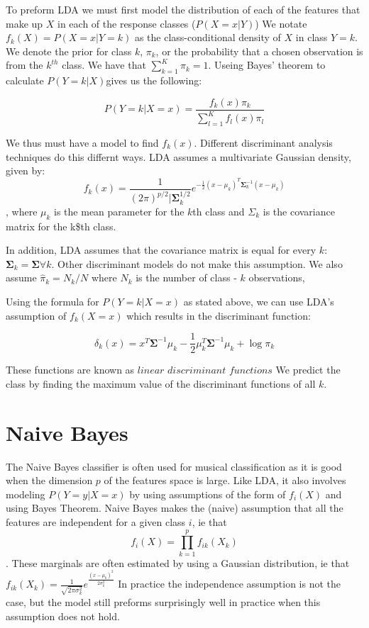 \documentclass[12pt,twoside]{reedthesis}
\theoremstyle{definition}
\theoremstyle{definition}
\theoremstyle{definition}
\theoremstyle{remark}
\begin{document}
To preform LDA we must first model the distribution of each of the
features that make up \(X\) in each of the response classes
(\(P(X = x|Y)\)) We notate \(f_k(X) = P(X = x| Y = k)\) as the
class-conditional density of \(X\) in class \(Y = k\). We denote the
prior for class \(k\), \(\pi_k\), or the probability that a chosen
observation is from the \(k^{th}\) class. We have that
\(\sum_{k=1}^K \pi_k = 1\). Useing Bayes' theorem to calculate
\(P(Y = k |X)\)gives us the following:

\[ P(Y = k | X = x) = \frac{f_k(x)\pi_k}{\sum_{l = 1}^Kf_l(x)\pi_l}\]

We thus must have a model to find \(f_k(x)\). Different discriminant
analysis techniques do this differnt ways. LDA assumes a multivariate
Gaussian density, given by:
\[f_k(x) = \frac{1}{(2\pi)^{p/2}|\mathbf{\Sigma}_k^{1/2}}e^{-\frac{1}{2}(x-\mu_k)^T\mathbf{\Sigma}_k^{-1}(x - \mu_k)}\]
, where \(\mu_k\) is the mean parameter for the \(k\)th class and
\(\Sigma_k\) is the covariance matrix for the k\$th class.

In addition, LDA assumes that the covariance matrix is equal for every
\(k\): \(\mathbf{\Sigma}_k = \mathbf{\Sigma} \forall k\). Other
discriminant models do not make this assumption. We also assume
\(\hat{\pi}_k = N_k/N\) where \(N_k\) is the number of class - \(k\)
observations,

Using the formula for \(P(Y = k|X=x)\) as stated above, we can use LDA's
assumption of \(f_k(X = x)\) which results in the discriminant function:

\[ \delta_k(x) = x^T\mathbf{\Sigma}^{-1}\mu_k - \frac{1}{2}\mu_k^T\mathbf{\Sigma}^{-1}\mu_k + \log \pi_k \]

These functions are known as \(\textit{linear discriminant functions}\)
We predict the class by finding the maximum value of the discriminant
functions of all \(k\).

\section{Naive Bayes}\label{naive-bayes}

The Naive Bayes classifier is often used for musical classification as
it is good when the dimension \(p\) of the features space is large. Like
LDA, it also involves modeling \(P(Y = y | X =x)\) by using assumptions
of the form of \(f_i(X)\) and using Bayes Theorem. Naive Bayes makes the
(naive) assumption that all the features are independent for a given
class \(i\), ie that \[f_i(X) = \prod_{k = 1}^p f_{ik}(X_k)\]. These
marginals are often estimated by using a Gaussian distribution, ie that
\(f_{ik}(X_k) = \frac{1}{\sqrt{2\pi\sigma_k^2}}e^{\frac{(x - \mu_k)^2}{2\sigma_k^2}}\)
In practice the independence assumption is not the case, but the model
still preforms surprisingly well in practice when this assumption does
not hold.
\end{document}
